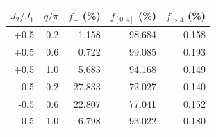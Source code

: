 \begin{tabular}{rrrrr}
\hline
$J_2/J_1$ & $q/\pi$ & $f_{-}$ (\%) & $f_{[0,4]}$ (\%) & $f_{>4}$ (\%) \\
\hline
+0.5 & 0.2 & 1.158 & 98.684 & 0.158 \\
+0.5 & 0.6 & 0.722 & 99.085 & 0.193 \\
+0.5 & 1.0 & 5.683 & 94.168 & 0.149 \\
-0.5 & 0.2 & 27.833 & 72.027 & 0.140 \\
-0.5 & 0.6 & 22.807 & 77.041 & 0.152 \\
-0.5 & 1.0 & 6.798 & 93.022 & 0.180 \\
\hline
\end{tabular}
